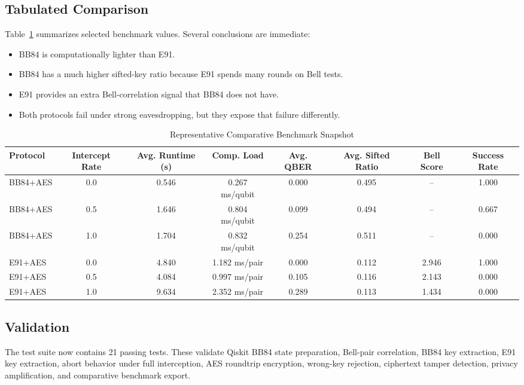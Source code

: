 \documentclass[conference]{IEEEtran}
\begin{document}
\subsection{Tabulated Comparison}
Table~\ref{tab:benchsummary} summarizes selected benchmark values. Several conclusions are immediate:
\begin{itemize}
\item BB84 is computationally lighter than E91.
\item BB84 has a much higher sifted-key ratio because E91 spends many rounds on Bell tests.
\item E91 provides an extra Bell-correlation signal that BB84 does not have.
\item Both protocols fail under strong eavesdropping, but they expose that failure differently.
\end{itemize}

\begin{table}[htbp]
\caption{Representative Comparative Benchmark Snapshot}
\centering
\begin{tabular}{lccccccc}
\toprule
\textbf{Protocol} & \textbf{Intercept Rate} & \textbf{Avg. Runtime (s)} & \textbf{Comp. Load} & \textbf{Avg. QBER} & \textbf{Avg. Sifted Ratio} & \textbf{Bell Score} & \textbf{Success Rate} \\
\midrule
BB84+AES & 0.0 & 0.546 & 0.267 ms/qubit & 0.000 & 0.495 & -- & 1.000 \\
BB84+AES & 0.5 & 1.646 & 0.804 ms/qubit & 0.099 & 0.494 & -- & 0.667 \\
BB84+AES & 1.0 & 1.704 & 0.832 ms/qubit & 0.254 & 0.511 & -- & 0.000 \\
E91+AES & 0.0 & 4.840 & 1.182 ms/pair & 0.000 & 0.112 & 2.946 & 1.000 \\
E91+AES & 0.5 & 4.084 & 0.997 ms/pair & 0.105 & 0.116 & 2.143 & 0.000 \\
E91+AES & 1.0 & 9.634 & 2.352 ms/pair & 0.289 & 0.113 & 1.434 & 0.000 \\
\bottomrule
\end{tabular}
\label{tab:benchsummary}
\end{table}

\subsection{Validation}
The test suite now contains 21 passing tests. These validate Qiskit BB84 state preparation, Bell-pair correlation, BB84 key extraction, E91 key extraction, abort behavior under full interception, AES roundtrip encryption, wrong-key rejection, ciphertext tamper detection, privacy amplification, and comparative benchmark export.
\end{document}
